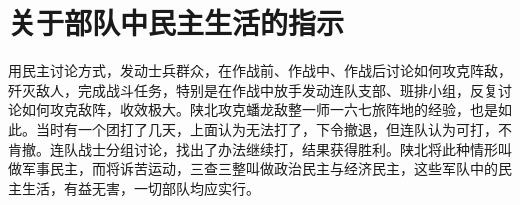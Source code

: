 \section[关于部队中民主生活的指示（一九四八年三月）]{关于部队中民主生活的指示}


用民主讨论方式，发动士兵群众，在作战前、作战中、作战后讨论如何攻克阵敌，歼灭敌人，完成战斗任务，特别是在作战中放手发动连队支部、班排小组，反复讨论如何攻克敌阵，收效极大。陕北攻克蟠龙敌整一师一六七旅阵地的经验，也是如此。当时有一个团打了几天，上面认为无法打了，下令撤退，但连队认为可打，不肯撤。连队战士分组讨论，找出了办法继续打，结果获得胜利。陕北将此种情形叫做军事民主，而将诉苦运动，三查三整叫做政治民主与经济民主，这些军队中的民主生活，有益无害，一切部队均应实行。

